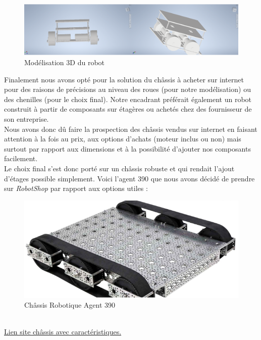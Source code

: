 \documentclass[french]{rapportENSTAB}
\begin{document}
\begin{figure}[H]
    \centering
    \includegraphics[scale=0.70]{images/robot/chassis 3D.png}
    \caption{Modélisation 3D du robot}
    \label{fig:cdcf}
\end{figure}

Finalement nous avons opté pour la solution du châssis à acheter sur internet pour des raisons de précisions au niveau des roues (pour notre modélisation) ou des chenilles (pour le choix final). Notre encadrant préférait également un robot construit à partir de composants sur étagères ou achetés chez des fournisseur de son entreprise.  \\

Nous avons donc dû faire la prospection des châssis vendus sur internet en faisant attention à la fois au prix, aux options d’achats (moteur inclus ou non) mais surtout par rapport aux dimensions et à la possibilité d’ajouter nos composants facilement.\\ 

Le choix final s’est donc porté sur un châssis robuste et qui rendait l'ajout d'étages possible simplement. Voici l’agent 390 que nous avons décidé de prendre sur \textit{RobotShop} par rapport aux options utiles : 

\begin{figure}[H]
    \centering
    \includegraphics[scale=0.70]{images/robot/chassis.png}
    \caption{Châssis Robotique Agent 390}
    \label{fig:cdcf}
\end{figure}\\
\href{https://www.robotshop.com/eu/fr/kit-robot-chenilles-agent-390-avec-moteurs.html}{Lien site châssis avec caractéristiques.}\\
\end{document}
